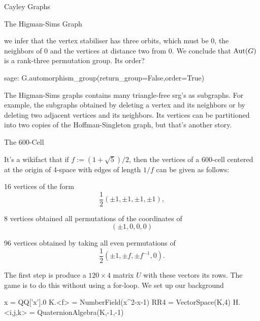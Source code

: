 \begin{chap}{Cayley Graphs}
\begin{sect}{The Higman-Sims Graph}
%
\begin{para}
we infer that the vertex stabiliser has three orbits, which must be 0,
the neighbors of 0 and the vertices at distance two from 0. We conclude
that $\mathrm{Aut}(G)$ is a rank-three permutation group. Its order?
\end{para}
%
\begin{sageexample}
    sage: G.automorphism_group(return_group=False,order=True)
\end{sageexample}
%
\begin{para}
The Higman-Sims graphs contains many triangle-free srg's as subgraphs.
For example, the subgraphs obtained by deleting a vertex and its neighbors
or by deleting two adjacent vertices and its neighbors. Its vertices
can be partitioned into two copies of the Hoffman-Singleton graph,
but that's another story.
\end{para}
%
\end{sect}
%
\begin{sect}{The 600-Cell}
%
\begin{para}
It's a wikifact that if $f:=(1+\sqrt{5})/2$, then the vertices of a 600-cell 
centered at the origin of 4-space with edges of length $1/f$ 
can be given as follows: 
\begin{enumerate}
    \begin{listitem}
    16 vertices of the form
    \[
        \frac12(\pm1,\pm1,\pm1,\pm1),
    \]
    \end{listitem}
    \begin{listitem}
    8 vertices obtained all permutations of the coordinates of
    \[
        (\pm1,0,0,0)
    \]
    \end{listitem}
    \begin{listitem}
    96 vertices obtained by taking all even permutations of
    \[
        \frac12\left(\pm1,\pm f,\pm f^{-1},0\right).
    \]
    \end{listitem}
\end{enumerate}  
\end{para}
%
\begin{para}
The first step is produce a $120\times4$ matrix $U$ with these vectors
its rows. The game is to do this without using a for-loop.
We set up our background
\end{para}
%
\begin{sageblock}
    x = QQ['x'].0
    K.<f> = NumberField(x^2-x-1)
    RR4 = VectorSpace(K,4) 
    H.<i,j,k> = QuaternionAlgebra(K,-1,-1)
\end{sageblock}
%
\begin{para}

\end{para}
\end{sect}
\end{chap}
